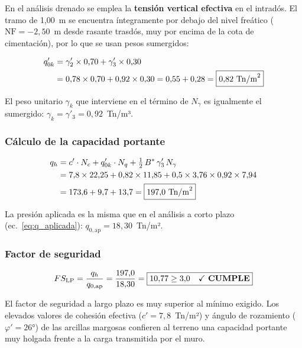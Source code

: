 En el análisis drenado se emplea la \textbf{tensión vertical efectiva} en el
intradós. El tramo de 1,00~m se encuentra íntegramente por debajo del nivel
freático ($\text{NF} = -2{,}50$~m desde rasante trasdós, muy por encima de la
cota de cimentación), por lo que se usan pesos sumergidos:

\begin{align*}
  q'_{0k} &= \gamma'_2 \times 0{,}70 + \gamma'_3 \times 0{,}30 \\
           &= 0{,}78 \times 0{,}70 + 0{,}92 \times 0{,}30
            = 0{,}55 + 0{,}28 = \boxed{0{,}82~\text{Tn/m}^2}
\end{align*}

El peso unitario $\gamma_k$ que interviene en el término de $N_\gamma$ es
igualmente el sumergido: $\gamma_k = \gamma'_3 = 0{,}92$~Tn/m³.

\subsubsection{Cálculo de la capacidad portante}

\begin{align}
  q_h &= c'\cdot N_c + q'_{0k}\cdot N_q
        + \tfrac{1}{2}\,B^*\,\gamma'_3\,N_\gamma \nonumber \\
      &= 7{,}8 \times 22{,}25
       + 0{,}82 \times 11{,}85
       + 0{,}5 \times 3{,}76 \times 0{,}92 \times 7{,}94 \nonumber \\
      &= 173{,}6 + 9{,}7 + 13{,}7
       = \boxed{197{,}0~\text{Tn/m}^2}
  \label{eq:qh_LP}
\end{align}

La presión aplicada es la misma que en el análisis a corto plazo
(ec.~\eqref{eq:q_aplicada}): $q_{0,\text{ap}} = 18{,}30$~Tn/m².

\subsubsection{Factor de seguridad}

\begin{equation}
  FS_\text{LP} = \frac{q_h}{q_{0,\text{ap}}}
               = \frac{197{,}0}{18{,}30}
               = \boxed{10{,}77 \geq 3{,}0 \quad \checkmark~\textbf{CUMPLE}}
  \label{eq:fs_hundimiento_LP}
\end{equation}

El factor de seguridad a largo plazo es muy superior al mínimo exigido. Los
elevados valores de cohesión efectiva ($c' = 7{,}8$~Tn/m²) y ángulo de
rozamiento ($\varphi' = 26°$) de las arcillas margosas confieren al terreno una
capacidad portante muy holgada frente a la carga transmitida por el muro.

